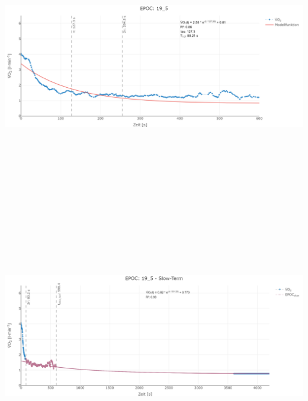 \documentclass[
  letterpaper,
  DIV=11]{scrartcl}
\begin{document}
\includegraphics[width=11.45833in,height=4.6875in]{images/19_5_tau.png}
\includegraphics[width=11.45833in,height=4.6875in]{images/19_5_slow.png}
\end{document}

